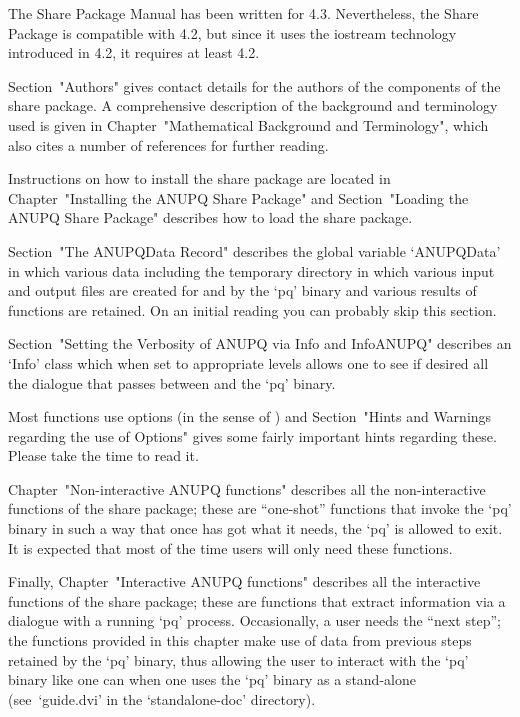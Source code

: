 \endlist


The {\ANUPQ} Share Package  Manual  has  been  written  for  {\GAP}  4.3.
Nevertheless, the {\ANUPQ} Share Package is compatible with  {\GAP}  4.2,
but since it uses the iostream technology introduced in  {\GAP}  4.2,  it
requires at least {\GAP} 4.2.

Section~"Authors" gives contact details for the authors of the components
of the  {\ANUPQ}  share  package.  A  comprehensive  description  of  the
background  and  terminology  used  is  given  in   Chapter~"Mathematical
Background and Terminology", which also cites a number of references  for
further reading.

Instructions on how to install the {\ANUPQ} share package are located  in
Chapter~"Installing the ANUPQ Share  Package"  and  Section~"Loading  the
ANUPQ Share Package" describes how to load the {\ANUPQ} share package.

Section~"The ANUPQData Record" describes the global variable  `ANUPQData'
in which various data including the temporary directory in which  various
input and output files are created for and by the `pq' binary and various
results of functions are retained. On an initial reading you can probably
skip this section.

Section~"Setting the Verbosity of ANUPQ via Info and InfoANUPQ" describes
an `Info' class which when set to appropriate levels allows one to see if
desired all the dialogue that passes between {\GAP} and the `pq' binary.

Most {\ANUPQ}  functions  use  options  (in  the  sense  of  {\GAP})  and
Section~"Hints and Warnings regarding the  use  of  Options"  gives  some
fairly important hints regarding these. Please take the time to read it.

Chapter~"Non-interactive   ANUPQ    functions"    describes    all    the
non-interactive functions  of  the  {\ANUPQ}  share  package;  these  are
``one-shot'' functions that invoke the `pq' binary in  such  a  way  that
once {\GAP} has got what it needs, the `pq' is allowed  to  exit.  It  is
expected that most of the time users will only need these functions.

Finally,  Chapter~"Interactive  ANUPQ  functions"   describes   all   the
interactive functions of the {\ANUPQ} share package; these are  functions
that extract information via a dialogue  with  a  running  `pq'  process.
Occasionally, a user needs the ``next step''; the functions  provided  in
this chapter make use of data from previous steps retained  by  the  `pq'
binary, thus allowing the user to interact with the `pq' binary like  one
can when one uses the `pq' binary as a  stand-alone  (see~`guide.dvi'  in
the `standalone-doc' directory).

